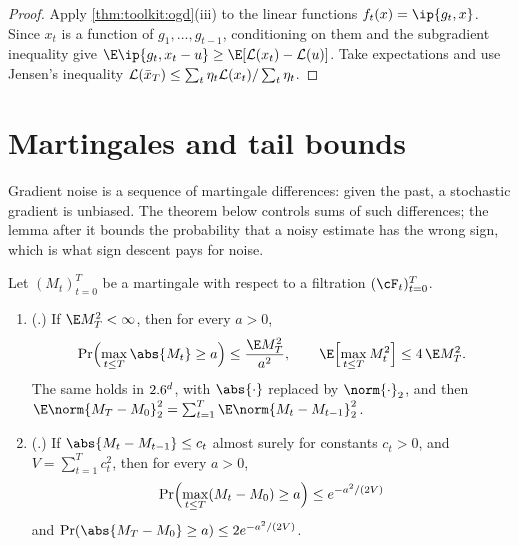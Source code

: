 \begin{refsection}
\begin{proof}
Apply \cref{thm:toolkit:ogd}(iii) to the linear functions $f_t(x)=\ip{g_t,x}$. Since $x_t$ is a function of $g_1,\dots,g_{t-1}$, conditioning on them and the subgradient inequality give $\E\ip{g_t,x_t-u}\ge\E[\Loss(x_t)-\Loss(u)]$. Take expectations and use Jensen's inequality $\mathcal{L}(\bar x_T)\le\sum_t\eta_t\mathcal{L}(x_t)/\sum_t\eta_t$.
\end{proof}

\section{Martingales and tail bounds}\label{sec:toolkit:prob}

Gradient noise is a sequence of martingale differences: given the past, a stochastic gradient is unbiased. The theorem below controls sums of such differences; the lemma after it bounds the probability that a noisy estimate has the wrong sign, which is what sign descent pays for noise.

\begin{theorem}\label{thm:toolkit:azuma}
Let $(M_t)_{t=0}^T$ be a martingale with respect to a filtration $(\cF_t)_{t=0}^T$.
\begin{enumerate}
\item (.) If $\E M_T^2<\infty$, then for every $a>0$,
\[
  \Pr\Bigl(\max_{t\le T}\abs{M_t}\ge a\Bigr)\le\frac{\E M_T^2}{a^2},\qquad\E\Bigl[\max_{t\le T}M_t^2\Bigr]\le4\,\E M_T^2 .
\]
The same holds in $2.6^d$, with $\abs{\cdot}$ replaced by $\norm{\cdot}_2$, and then $\E\norm{M_T-M_0}_2^2=\sum_{t=1}^T\E\norm{M_t-M_{t-1}}_2^2$.
\item (.) If $\abs{M_t-M_{t-1}}\le c_t$ almost surely for constants $c_t>0$, and $V=\sum_{t=1}^Tc_t^2$, then for every $a>0$,
\[
  \Pr\Bigl(\max_{t\le T}(M_t-M_0)\ge a\Bigr)\le e^{-a^2/(2V)}
\]
and $\Pr(\abs{M_T-M_0}\ge a)\le2e^{-a^2/(2V)}$.
\end{enumerate}
\end{theorem}


\end{refsection}
